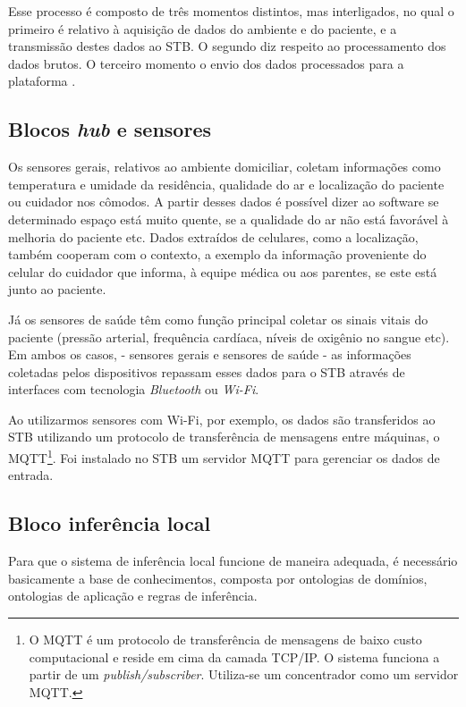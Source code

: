 Esse processo é composto de três momentos distintos, mas interligados, no qual
o primeiro é relativo à aquisição de dados do ambiente e do paciente, e a
transmissão destes dados ao STB. O segundo diz respeito ao processamento dos
dados brutos. O terceiro momento o envio dos dados processados para a plataforma
\nextsaude[].


\subsection{Blocos \textit{hub} e sensores}

Os sensores gerais, relativos ao ambiente domiciliar, coletam
informações como  temperatura e umidade da residência, qualidade do ar e
localização do paciente ou cuidador nos cômodos. A partir desses dados é
possível dizer ao software se determinado espaço está muito quente, se a
qualidade do ar não está favorável à melhoria do paciente etc. Dados extraídos
de celulares, como a localização, também cooperam com o contexto, a exemplo da
informação proveniente do celular do cuidador que informa, à equipe médica ou
aos parentes, se este está junto ao paciente.

Já os sensores de saúde têm como função principal coletar os sinais vitais do
paciente (pressão arterial, frequência cardíaca, níveis de oxigênio no sangue
etc). Em ambos os casos, - sensores gerais e sensores de saúde - as informações
coletadas pelos dispositivos repassam  esses dados para o STB através de
interfaces com tecnologia  \textit{Bluetooth} ou \textit{Wi-Fi}.

Ao utilizarmos sensores com Wi-Fi, por exemplo, os dados são transferidos ao
STB utilizando um protocolo de transferência de mensagens entre máquinas, o
MQTT\footnote{O MQTT é um protocolo de transferência de mensagens de baixo
custo computacional e reside em cima da camada TCP/IP. O sistema funciona a
partir de um \textit{publish/subscriber}. Utiliza-se um concentrador como um
servidor MQTT.}.  Foi instalado no STB um servidor MQTT para gerenciar os dados
de entrada.

\subsection{Bloco inferência local}

Para que o sistema de inferência local funcione de maneira adequada, é
necessário basicamente a base de conhecimentos, composta por ontologias de
domínios, ontologias de aplicação e regras de inferência. 

